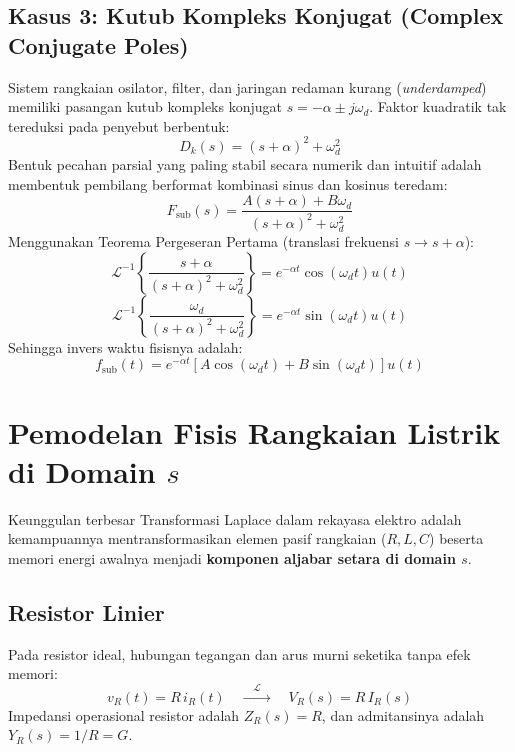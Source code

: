 \documentclass[11pt,a4paper]{article}
\theoremstyle{definition}
\begin{document}
\subsection{Kasus 3: Kutub Kompleks Konjugat (Complex Conjugate Poles)}
Sistem rangkaian osilator, filter, dan jaringan redaman kurang (\textit{underdamped}) memiliki pasangan kutub kompleks konjugat $s = -\alpha \pm j\omega_d$. Faktor kuadratik tak tereduksi pada penyebut berbentuk:
\begin{equation}
    D_k(s) = (s + \alpha)^2 + \omega_d^2
\end{equation}
Bentuk pecahan parsial yang paling stabil secara numerik dan intuitif adalah membentuk pembilang berformat kombinasi sinus dan kosinus teredam:
\begin{equation}
    F_{\text{sub}}(s) = \frac{A(s + \alpha) + B \omega_d}{(s + \alpha)^2 + \omega_d^2}
    \label{eq:complex_pfe_standard}
\end{equation}
Menggunakan Teorema Pergeseran Pertama (translasi frekuensi $s \to s + \alpha$):
\begin{equation}
    \mathcal{L}^{-1}\left\{ \frac{s + \alpha}{(s + \alpha)^2 + \omega_d^2} \right\} = e^{-\alpha t} \cos(\omega_d t) u(t)
\end{equation}
\begin{equation}
    \mathcal{L}^{-1}\left\{ \frac{\omega_d}{(s + \alpha)^2 + \omega_d^2} \right\} = e^{-\alpha t} \sin(\omega_d t) u(t)
\end{equation}
Sehingga invers waktu fisisnya adalah:
\begin{equation}
    f_{\text{sub}}(t) = e^{-\alpha t} \left[ A \cos(\omega_d t) + B \sin(\omega_d t) \right] u(t)
    \label{eq:complex_inv_time}
\end{equation}

\section{Pemodelan Fisis Rangkaian Listrik di Domain \texorpdfstring{$s$}{s}}

Keunggulan terbesar Transformasi Laplace dalam rekayasa elektro adalah kemampuannya mentransformasikan elemen pasif rangkaian ($R, L, C$) beserta memori energi awalnya menjadi \textbf{komponen aljabar setara di domain $s$}.

\subsection{Resistor Linier}
Pada resistor ideal, hubungan tegangan dan arus murni seketika tanpa efek memori:
\begin{equation}
    v_R(t) = R \, i_R(t) \quad \xrightarrow{\quad \mathcal{L} \quad} \quad V_R(s) = R \, I_R(s)
\end{equation}
Impedansi operasional resistor adalah $Z_R(s) = R$, dan admitansinya adalah $Y_R(s) = 1/R = G$.
\end{document}
